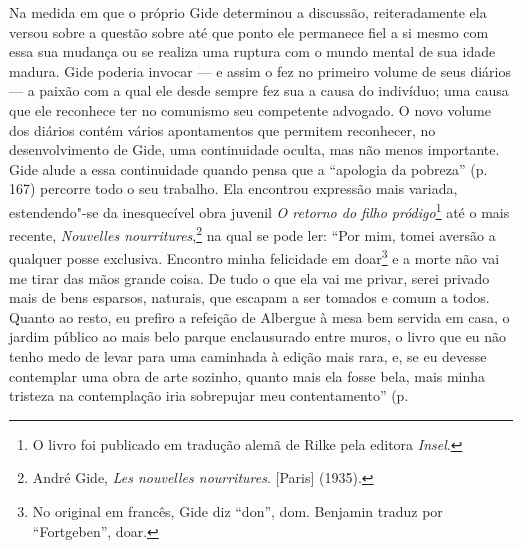 Na medida em que o próprio Gide determinou a discussão, reiteradamente
ela versou sobre a questão sobre até que ponto ele permanece fiel a si
mesmo com essa sua mudança ou se realiza uma ruptura com o mundo mental
de sua idade madura. Gide poderia invocar --- e assim o fez no primeiro
volume de seus diários --- a paixão com a qual ele desde sempre fez sua a
causa do indivíduo; uma causa que ele reconhece ter no comunismo seu
competente advogado. O novo volume dos diários contém vários apontamentos que
permitem reconhecer, no desenvolvimento de Gide, uma continuidade oculta, mas não menos importante. Gide alude a essa continuidade quando pensa
que a ``apologia da pobreza'' (p. 167) percorre todo o seu trabalho.
Ela encontrou expressão mais variada, estendendo"-se da inesquecível obra
juvenil \emph{O retorno do filho pródigo}\footnote{O livro foi
  publicado em tradução alemã de Rilke pela editora \emph{Insel}. \versal{[N. A.]}} até o
mais recente, \emph{Nouvelles nourritures},\footnote{André Gide,
  \emph{Les nouvelles nourritures}. {[}Paris{]} (1935). \versal{[N. A.]}} na qual
se pode ler: ``Por mim, tomei aversão a qualquer posse exclusiva.
Encontro minha felicidade em doar\footnote{No original em
  francês, Gide diz ``don'', dom. Benjamin traduz por ``Fortgeben'',
  doar. \versal{[N. T.]}} e a morte não vai me tirar das mãos grande coisa. De tudo o que
ela vai me privar, serei privado mais de bens esparsos, naturais, que
escapam a ser tomados e comum a todos. Quanto ao resto, eu prefiro a
refeição de Albergue à mesa bem servida em casa, o jardim público ao
mais belo parque enclausurado entre muros, o livro que eu não tenho medo
de levar para uma caminhada à edição mais rara, e, se eu devesse
contemplar uma obra de arte sozinho, quanto mais ela fosse bela, mais
minha tristeza na contemplação iria sobrepujar meu contentamento'' (p.
